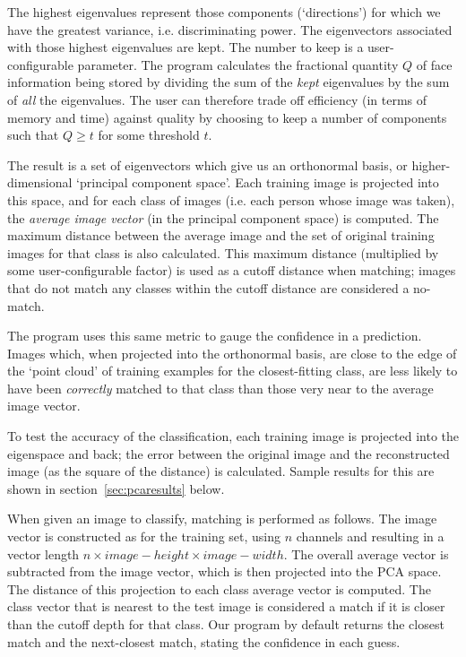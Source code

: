 The highest eigenvalues represent those components (`directions') for which we have the greatest variance, i.e. discriminating power. The eigenvectors associated with those highest eigenvalues are kept. The number to keep is a user-configurable parameter. The program calculates the fractional quantity $Q$ of face information being stored by dividing the sum of the \emph{kept} eigenvalues by the sum of \emph{all} the eigenvalues. The user can therefore trade off efficiency (in terms of memory and time) against quality by choosing to keep a number of components such that $Q \geq t$ for some threshold $t$.

The result is a set of eigenvectors which give us an orthonormal basis, or higher-dimensional `principal component space'. Each training image is projected into this space, and for each class of images (i.e. each person whose image was taken), the \emph{average image vector} (in the principal component space) is computed. The maximum distance between
the average image and the set of original training images for that class is also calculated. This maximum distance
(multiplied by some user-configurable factor) is used as a cutoff distance when
matching; images that do not match any classes within the cutoff distance are
considered a no-match.

The program uses this same metric to gauge the confidence in a prediction. Images which, when projected into the orthonormal basis, are close to the edge of the `point cloud' of training examples for the closest-fitting class, are less likely to have been \emph{correctly} matched to that class than those very near to the average image vector.

To test the accuracy of the classification, each training image is projected
into the eigenspace and back; the error between the original image and the
reconstructed image (as the square of the distance) is calculated. Sample results for
this are shown in section~\ref{sec:pcaresults} below.

When given an image to classify, matching is performed as follows. The image vector is constructed as for the training set, using $n$ channels and resulting in a vector length $n \times image-height \times image-width$. The overall average vector is subtracted from the image vector, which is then projected into the PCA space. The distance of this projection to each class average vector is computed. The class vector that is nearest to the test image is considered a match if it is closer than the cutoff depth for that class. Our program by default returns the closest match and the next-closest match, stating the confidence in each guess.

